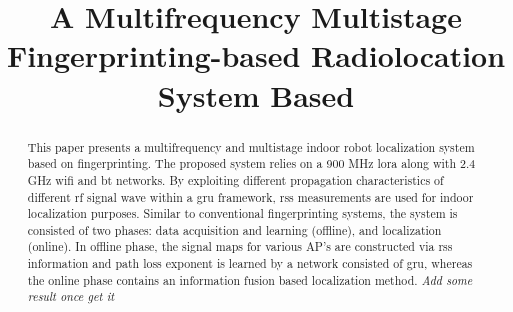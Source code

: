 \documentclass[conference]{IEEEtran}
\begin{document}
%
\title{A Multifrequency Multistage Fingerprinting-based Radiolocation System Based}


\author{
\and
{}
}

\maketitle

\begin{abstract}
    This paper presents a multifrequency and multistage indoor robot localization system based on fingerprinting.
    The proposed system relies on a 900 MHz \gls{lora} along with 2.4 GHz \gls{wifi} and \gls{bt} networks.
    By exploiting different propagation characteristics of different \gls{rf} signal wave within a \gls{gru} framework, \gls{rss} measurements are used for indoor localization purposes.
    Similar to conventional fingerprinting systems, the system is consisted of two phases: data acquisition and learning (offline), and localization (online).
    In offline phase, the signal maps for various AP's are constructed via \gls{rss} information and path loss exponent is learned by a network consisted of \gls{gru}, whereas the online phase contains an information fusion based localization method.
    \textit{Add some result once get it}
\end{abstract}
\end{document}
